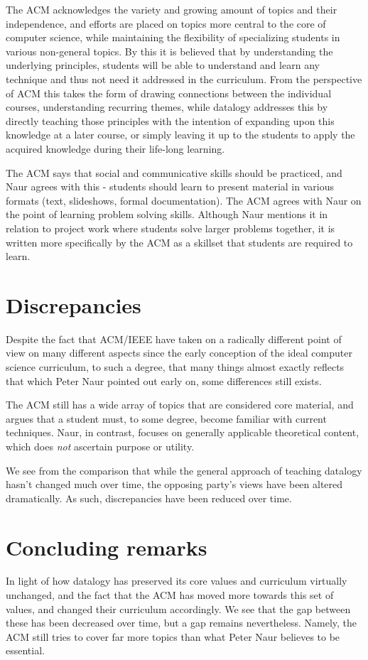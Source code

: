 \documentclass{article}
\begin{document}
The ACM acknowledges the variety and growing amount of topics and their independence, and efforts are placed on topics
more central to the core of computer science, while maintaining the flexibility of specializing students in various
non-general topics. By this it is believed that by understanding the underlying principles, students will be able to
understand and learn any technique and thus not need it addressed in the curriculum. From the perspective of ACM this
takes the form of drawing connections between the individual courses, understanding recurring themes, while datalogy
addresses this by directly teaching those principles with the intention of expanding upon this knowledge at a later
course, or simply leaving it up to the students to apply the acquired knowledge during their life-long learning.

The ACM says that social and communicative skills should be practiced, and Naur agrees with this - students should learn
to present material in various formats (text, slideshows, formal documentation).
The ACM agrees with Naur on the point of learning problem solving skills. Although Naur mentions it in relation to
project work where students solve larger problems together, it is written more specifically by the ACM as a skillset
that students are required to learn.

\section{Discrepancies}
Despite the fact that ACM/IEEE have taken on a radically different point of view on many different aspects since the
early conception of the ideal computer science curriculum, to such a degree, that many things almost exactly reflects
that which Peter Naur pointed out early on, some differences still exists.

The ACM still has a wide array of topics that are considered core material, and argues that a student must, to some
degree, become familiar with current techniques. Naur, in contrast, focuses on generally applicable theoretical content,
which does \emph{not} ascertain purpose or utility.

We see from the comparison that while the general approach of teaching datalogy hasn’t changed much over time, the
opposing party’s views have been altered dramatically. As such, discrepancies have been reduced over time.

\section{Concluding remarks}
In light of how datalogy has preserved its core values and curriculum virtually unchanged, and the fact that the ACM has
moved more towards this set of values, and changed their curriculum accordingly. We see that the gap between these has
been decreased over time, but a gap remains nevertheless. Namely, the ACM still tries to cover far more topics than what
Peter Naur believes to be essential.
\end{document}
